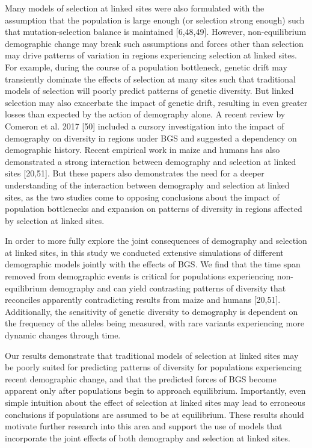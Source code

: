 \documentclass[9pt,twocolumn,twoside]{rilabRxiv}
\begin{document}
Many models of selection at linked sites were also formulated with the assumption that the population is large enough (or selection strong enough) such that mutation-selection balance is maintained [6,48,49].
However, non-equilibrium demographic change may break such assumptions and forces other than selection may drive patterns of variation in regions experiencing selection at linked sites.
For example, during the course of a population bottleneck, genetic drift may transiently dominate the effects of selection at many sites such that traditional models of selection will poorly predict patterns of genetic diversity.
But linked selection may also exacerbate the impact of genetic drift, resulting in even greater losses than expected by the action of demography alone.
A recent review by Comeron et al. 2017 [50] included a cursory investigation into the impact of demography on diversity in regions under BGS and suggested a dependency on demographic history.
Recent empirical work in maize and humans has also demonstrated a strong interaction between demography and selection at linked sites [20,51].
But these papers also demonstrates the need for a deeper understanding of the interaction between demography and selection at linked sites, as the two studies come to opposing conclusions about the impact of population bottlenecks and expansion on patterns of diversity  in regions affected by selection at linked sites.

In order to more fully explore the joint consequences of demography and selection at linked sites, in this study we conducted extensive simulations of different demographic models jointly with the effects of BGS.
We find that the time span removed from demographic events is critical for populations experiencing non-equilibrium demography and can yield contrasting patterns of diversity that reconciles apparently contradicting results from maize and humans  [20,51].
Additionally, the sensitivity of genetic diversity to demography is dependent on the frequency of the alleles being measured, with rare variants experiencing more dynamic changes through time.

Our results demonstrate that traditional models of selection at linked sites may be poorly suited for predicting patterns of diversity for populations experiencing recent demographic change, and that the predicted forces of BGS become apparent only after populations begin to approach equilibrium.
Importantly, even simple intuition about the effect of selection at linked sites may lead to erroneous conclusions if populations are assumed to be at equilibrium.
These results should motivate further research into this area and support the use of models that incorporate the joint effects of both demography and selection at linked sites.
\end{document}
